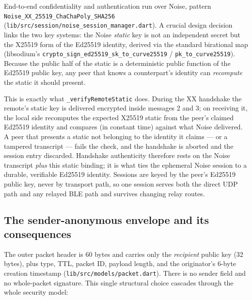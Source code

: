 \documentclass[11pt]{report}
\newcommand{\code}[1]{\texttt{\small #1}}
\begin{document}
End-to-end confidentiality and authentication run over Noise, pattern \code{Noise\_XX\_25519\_ChaChaPoly\_SHA256} (\code{lib/src/session/noise_session_manager.dart}). A crucial design decision links the two key systems: the Noise \emph{static} key is not an independent secret but the X25519 form of the Ed25519 identity, derived via the standard birational map (libsodium's \code{crypto\_sign\_ed25519\_sk\_to\_curve25519} / \code{pk\_to\_curve25519}). Because the public half of the static is a deterministic public function of the Ed25519 public key, any peer that knows a counterpart's identity can \emph{recompute} the static it should present.

This is exactly what \code{\_verifyRemoteStatic} does. During the XX handshake the remote's static key is delivered encrypted inside messages 2 and 3; on receiving it, the local side recomputes the expected X25519 static from the peer's claimed Ed25519 identity and compares (in constant time) against what Noise delivered. A peer that presents a static not belonging to the identity it claims — or a tampered transcript — fails the check, and the handshake is aborted and the session entry discarded. Handshake authenticity therefore rests on the Noise transcript \emph{plus} this static binding; it is what ties the ephemeral Noise session to a durable, verifiable Ed25519 identity. Sessions are keyed by the peer's Ed25519 public key, never by transport path, so one session serves both the direct UDP path and any relayed BLE path and survives changing relay routes.

\subsection{The sender-anonymous envelope and its consequences}

The outer packet header is 60 bytes and carries only the \emph{recipient} public key (32 bytes), plus type, TTL, packet ID, payload length, and the originator's 6-byte creation timestamp (\code{lib/src/models/packet.dart}). There is no sender field and no whole-packet signature. This single structural choice cascades through the whole security model:
\end{document}
